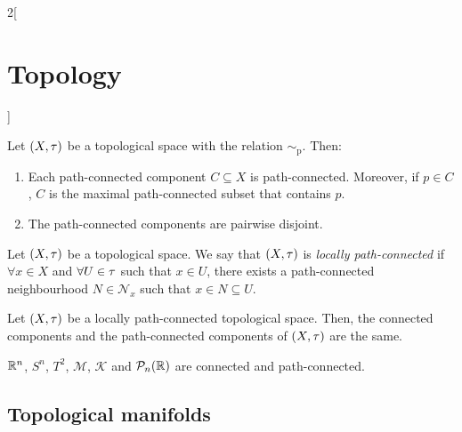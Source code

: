\documentclass[../../../main.tex]{subfiles}
\begin{document}
\begin{multicols}{2}[\section{Topology}]
\begin{prop}
    Let $(X,\tau)$ be a topological space with the relation $\sim_\text{p}$. Then:
    \begin{enumerate}
      \item Each path-connected component $C\subseteq X$ is path-connected. Moreover, if $p\in C$, $C$ is the maximal path-connected subset that contains $p$.
      \item The path-connected components are pairwise disjoint.
    \end{enumerate}
  \end{prop}
  \begin{definition}
    Let $(X,\tau)$ be a topological space. We say that $(X,\tau)$ is \emph{locally path-connected} if $\forall x\in X$ and $\forall U\in\tau$ such that $x\in U$, there exists a path-connected neighbourhood $N\in\mathcal{N}_x$ such that $x\in N\subseteq U$.
  \end{definition}
  \begin{theorem}
    Let $(X,\tau)$ be a locally path-connected topological space. Then, the connected components and the path-connected components of $(X,\tau)$ are the same.
  \end{theorem}
  \begin{prop}
    $\mathbb{R}^n$, $S^n$, $T^2$, $\mathcal{M}$, $\mathcal{K}$ and $\mathcal{P}_n(\mathbb{R})$ are connected and path-connected.
  \end{prop}
  \subsection{Topological manifolds}

\end{multicols}
\end{document}

